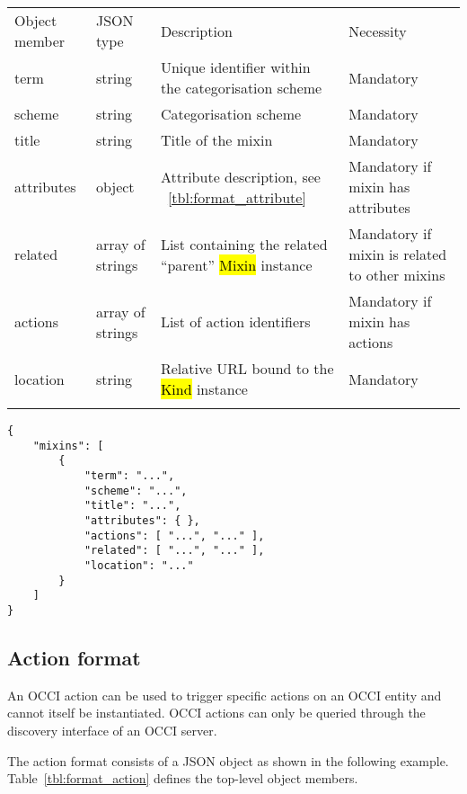 \documentclass[10pt,a4paper]{article}
\begin{document}
 {
    \begin{tabular}{llll}
    \toprule
    Object member & JSON type & Description & Necessity\\
    \colrule
    term & string & Unique identifier within the categorisation scheme & Mandatory\\
    scheme & string & Categorisation scheme & Mandatory\\
    title & string & Title of the mixin & Mandatory\\
    attributes & object & Attribute description, see ~\ref{tbl:format_attribute} & Mandatory if mixin has attributes\\
    related & array of strings & List containing the related ``parent'' \hl{Mixin} instance & Mandatory if mixin is related to other mixins\\
    actions & array of strings & List of action identifiers & Mandatory if mixin has actions\\
    location & string & Relative URL bound to the \hl{Kind} instance & Mandatory\\
    \botrule
    \end{tabular}
}

\begin{verbatim}
{
    "mixins": [
        {
            "term": "...",
            "scheme": "...",
            "title": "...",
            "attributes": { },
            "actions": [ "...", "..." ],
            "related": [ "...", "..." ],
            "location": "..."
        }
    ]
}
\end{verbatim}

\subsection{Action format}
\label{sec:format_action}

An OCCI action can be used to trigger specific actions on an OCCI entity and cannot itself be 
instantiated. OCCI actions can only be queried through the discovery interface 
of an OCCI server.

The action format consists of a JSON object as shown in the
following example.
Table~\ref{tbl:format_action} defines the top-level object members.
\end{document}
